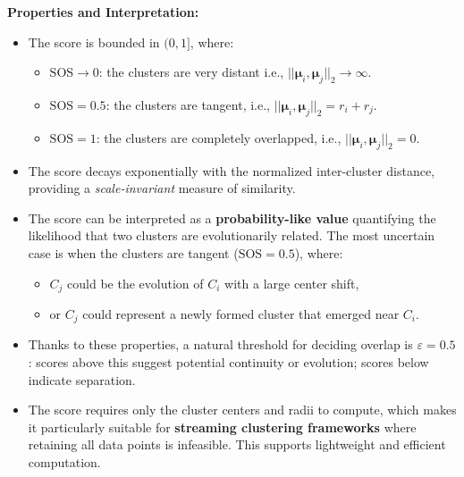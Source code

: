 \textbf{Properties and Interpretation:}
\begin{itemize}
      \item The score is bounded in $ (0, 1] $, where:
            \begin{itemize}
                  \item $ \text{SOS} \to 0 $: the clusters are very distant i.e., $ ||\boldsymbol{\mu}_i, \boldsymbol{\mu}_j||_2 \rightarrow \infty $.
                  \item $ \text{SOS} = 0.5 $: the clusters are tangent, i.e., $ ||\boldsymbol{\mu}_i, \boldsymbol{\mu}_j||_2 = r_i + r_j $.
                  \item $ \text{SOS} = 1 $: the clusters are completely overlapped, i.e., $ ||\boldsymbol{\mu}_i, \boldsymbol{\mu}_j||_2 = 0 $.
            \end{itemize}

      \item The score decays exponentially with the normalized inter-cluster distance,
            providing a \emph{scale-invariant} measure of similarity.

      \item The score can be interpreted as a \textbf{probability-like value} quantifying
            the likelihood that two clusters are evolutionarily related. The most uncertain
            case is when the clusters are tangent ($ \text{SOS} = 0.5 $), where:
            \begin{itemize}
                  \item $ C_j $ could be the evolution of $ C_i $ with a large center shift,
                  \item or $ C_j $ could represent a newly formed cluster that emerged near $ C_i $.
            \end{itemize}

      \item Thanks to these properties, a natural threshold for deciding overlap is $
                  \varepsilon = 0.5 $: scores above this suggest potential continuity or evolution;
            scores below indicate separation.

      \item The score requires only the cluster centers and radii to compute, which makes
            it particularly suitable for \textbf{streaming clustering frameworks} where
            retaining all data points is infeasible. This supports lightweight and
            efficient computation.
\end{itemize}

